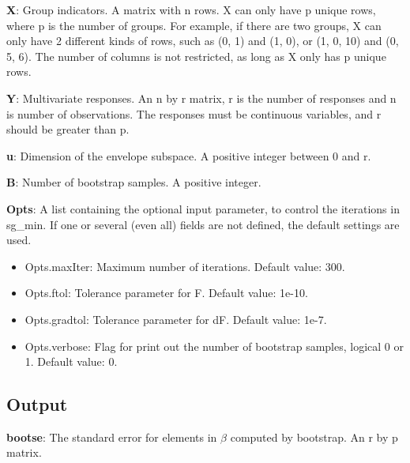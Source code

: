 \documentclass[a4paper,11pt,openany]{memoir}
\begin{document}
\begin{par}
\textbf{X}: Group indicators. A matrix with n rows.  X can only have p unique  rows, where p is the number of groups. For example, if there are two groups, X can only have 2 different kinds of rows, such as (0, 1) and (1, 0), or (1, 0, 10) and (0, 5, 6).  The number of columns is not restricted, as long as X only has p unique rows.
\end{par} \vspace{1em}
\begin{par}
\textbf{Y}: Multivariate responses. An n by r matrix, r is the number of responses and n is number of observations. The responses must be continuous variables, and r should be greater than p.
\end{par} \vspace{1em}
\begin{par}
\textbf{u}: Dimension of the envelope subspace.  A positive integer between 0 and r.
\end{par} \vspace{1em}
\begin{par}
\textbf{B}: Number of bootstrap samples.  A positive integer.
\end{par} \vspace{1em}
\begin{par}
\textbf{Opts}: A list containing the optional input parameter, to control the iterations in sg\_min. If one or several (even all) fields are not defined, the default settings are used.
\end{par} \vspace{1em}
\begin{itemize}
\setlength{\itemsep}{-1ex}
   \item Opts.maxIter: Maximum number of iterations.  Default value: 300.
   \item Opts.ftol: Tolerance parameter for F.  Default value: 1e-10.
   \item Opts.gradtol: Tolerance parameter for dF.  Default value: 1e-7.
   \item Opts.verbose: Flag for print out the number of bootstrap samples, logical 0 or 1. Default value: 0.
\end{itemize}


\subsection*{Output}

\begin{par}
\textbf{bootse}: The standard error for elements in $\beta$ computed by bootstrap.  An r by p matrix.
\end{par} \vspace{1em}
\end{document}
